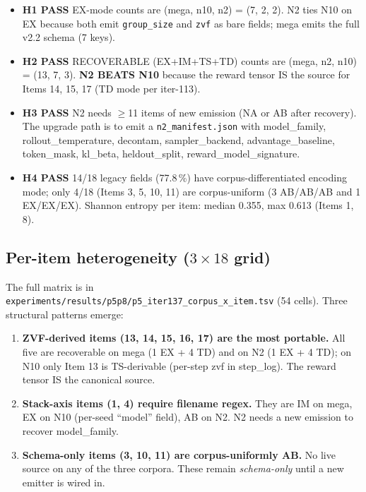 \documentclass{article}  \usepackage[preprint,nonatbib]{neurips_2026} \usepackage[numbers]{natbib}
\begin{document}
\begin{itemize}
  \item \textbf{H1 PASS} EX-mode counts are (mega, n10, n2) = (7, 2, 2).
    N2 ties N10 on EX because both emit \texttt{group\_size} and \texttt{zvf}
    as bare fields; mega emits the full v2.2 schema (7 keys).
  \item \textbf{H2 PASS} RECOVERABLE (EX+IM+TS+TD) counts are (mega, n2,
    n10) = (13, 7, 3). \textbf{N2 BEATS N10} because the reward tensor IS
    the source for Items 14, 15, 17 (TD mode per iter-113).
  \item \textbf{H3 PASS} N2 needs $\geq$11 items of new emission (NA or AB
    after recovery). The upgrade path is to emit a
    \texttt{n2\_manifest.json} with model\_family, rollout\_temperature,
    decontam, sampler\_backend, advantage\_baseline, token\_mask,
    kl\_beta, heldout\_split, reward\_model\_signature.
  \item \textbf{H4 PASS} 14/18 legacy fields (77.8\,\%) have corpus-differentiated
    encoding mode; only 4/18 (Items 3, 5, 10, 11) are corpus-uniform
    (3 AB/AB/AB and 1 EX/EX/EX). Shannon entropy per item: median 0.355,
    max 0.613 (Items 1, 8).
\end{itemize}

\subsection*{Per-item heterogeneity (\texorpdfstring{$3 \times 18$}{3x18} grid)}

The full matrix is in
\texttt{experiments/results/p5p8/p5\_iter137\_corpus\_x\_item.tsv} (54 cells).
Three structural patterns emerge:

\begin{enumerate}
  \item \textbf{ZVF-derived items (13, 14, 15, 16, 17) are the most
    portable.} All five are recoverable on mega (1 EX + 4 TD) and on N2
    (1 EX + 4 TD); on N10 only Item 13 is TS-derivable (per-step zvf in
    step\_log). The reward tensor IS the canonical source.
  \item \textbf{Stack-axis items (1, 4) require filename regex.} They are
    IM on mega, EX on N10 (per-seed ``model'' field), AB on N2. N2 needs a
    new emission to recover model\_family.
  \item \textbf{Schema-only items (3, 10, 11) are corpus-uniformly AB.}
    No live source on any of the three corpora. These remain
    \emph{schema-only} until a new emitter is wired in.
\end{enumerate}
\end{document}
